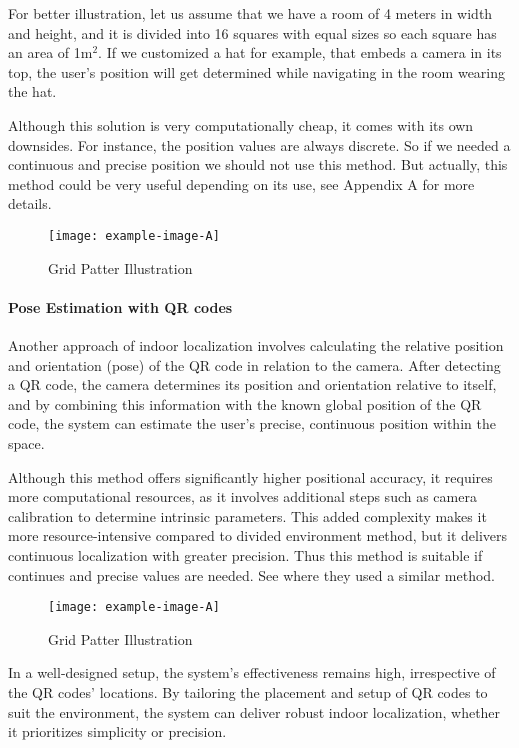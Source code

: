 For better illustration, let us assume that we have a room of 4 meters in width and height, and it is divided into 16 squares with equal sizes so each square has an area of 1m$^2$. If we customized a hat for example, that embeds a camera in its top, the user’s position will get
determined while navigating in the room wearing the hat.

Although this solution is very computationally cheap, it comes with its own
downsides. For instance, the position values are always discrete. So if we needed
a continuous and precise position we should not use this method. But actually,
this method could be very useful depending on its use, see Appendix A for more details.

\begin{figure}[h] %
	\centering
	\texttt{[image: example-image-A]}
	\caption{Grid Patter Illustration}
	\label{grid_pattern_illustration}
\end{figure}



\paragraph{Pose Estimation with QR codes}

Another approach of indoor localization involves calculating the relative position and orientation (pose) of the QR code in relation to the camera. After detecting a QR code, the camera determines its position and orientation relative to itself, and by combining this information with the known global position of the QR code, the system can estimate the user’s precise, continuous position within the space.

Although this method offers significantly higher positional accuracy, it requires more computational resources, as it involves additional steps such as camera calibration to determine intrinsic parameters. This added complexity makes it more resource-intensive compared to divided environment method, but it delivers continuous localization with greater precision. Thus this method is suitable if continues and precise values are needed. See \cite{Lucag2017} where they used a similar method.

\begin{figure}[h] %
	\centering
	\texttt{[image: example-image-A]}
	\caption{Grid Patter Illustration}
	\label{pose_estimation_illustration}
\end{figure}


In a well-designed setup, the system's effectiveness remains high, irrespective of the QR codes’ locations. By tailoring the placement and setup of QR codes to suit the environment, the system can deliver robust indoor localization, whether it prioritizes simplicity or precision.